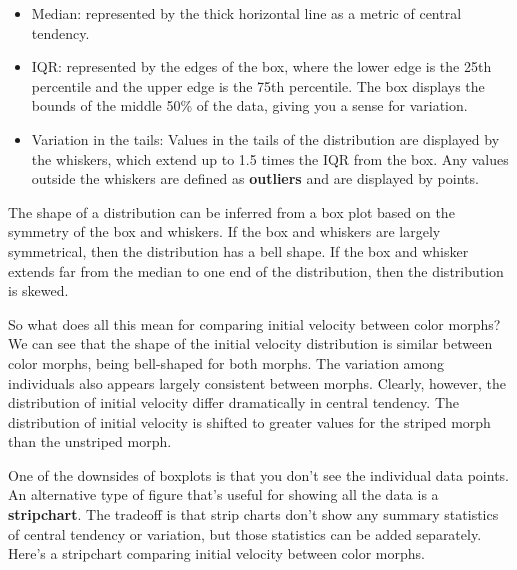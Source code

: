 \documentclass[
]{book}
\begin{document}
\begin{itemize}
\item
  Median: represented by the thick horizontal line as a metric of central tendency.
\item
  IQR: represented by the edges of the box, where the lower edge is the 25th percentile and the upper edge is the 75th percentile. The box displays the bounds of the middle 50\% of the data, giving you a sense for variation.
\item
  Variation in the tails: Values in the tails of the distribution are displayed by the whiskers, which extend up to 1.5 times the IQR from the box. Any values outside the whiskers are defined as \textbf{outliers} and are displayed by points.
\end{itemize}

The shape of a distribution can be inferred from a box plot based on the symmetry of the box and whiskers. If the box and whiskers are largely symmetrical, then the distribution has a bell shape. If the box and whisker extends far from the median to one end of the distribution, then the distribution is skewed.

So what does all this mean for comparing initial velocity between color morphs? We can see that the shape of the initial velocity distribution is similar between color morphs, being bell-shaped for both morphs. The variation among individuals also appears largely consistent between morphs. Clearly, however, the distribution of initial velocity differ dramatically in central tendency. The distribution of initial velocity is shifted to greater values for the striped morph than the unstriped morph.

One of the downsides of boxplots is that you don't see the individual data points. An alternative type of figure that's useful for showing all the data is a \textbf{stripchart}. The tradeoff is that strip charts don't show any summary statistics of central tendency or variation, but those statistics can be added separately. Here's a stripchart comparing initial velocity between color morphs.
\end{document}
